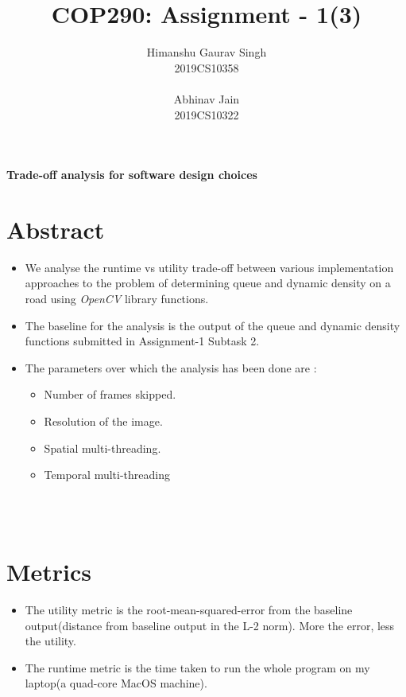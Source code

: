 \documentclass[a4paper]{article}
\title{COP290: Assignment - 1(3)}
\author{
Himanshu Gaurav Singh \\ 
2019CS10358 
\\ \\
Abhinav Jain \\
2019CS10322 \\  }
\begin{document}
\maketitle
\begin{center} \textbf{ \Large Trade-off analysis for software design choices} 
\end{center}
\section*{Abstract}
\begin{itemize}
\item We analyse the runtime vs utility trade-off between various implementation approaches to the problem of determining queue and dynamic density on a road using \textit{OpenCV} library functions.
\item The baseline for the analysis is the output of the queue and dynamic density functions submitted in Assignment-1 Subtask 2. 
\item The parameters over which the analysis has been done are : 
\begin{itemize}
    \item Number of frames skipped.
    \item Resolution of the image.
    \item Spatial multi-threading.
    \item Temporal multi-threading
\end{itemize} 
\end{itemize}    \\ \\ 
\section *{Metrics}
\begin{itemize}
    \item The utility metric is the root-mean-squared-error from the baseline output(distance from baseline output in the L-2 norm). More the error, less the utility. 
    \item The runtime metric is the time taken to run the whole program on my laptop(a quad-core MacOS machine).
\end{itemize}
\end{document}
